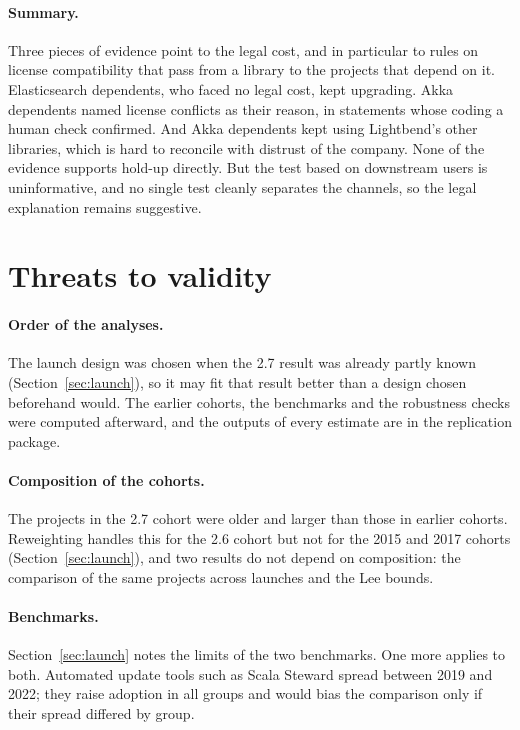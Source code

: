 \documentclass[11pt]{article}
\begin{document}
\paragraph{Summary.} Three pieces of evidence point to the legal cost, and in particular to rules on license compatibility that pass from a library to the projects that depend on it. Elasticsearch dependents, who faced no legal cost, kept upgrading. Akka dependents named license conflicts as their reason, in statements whose coding a human check confirmed. And Akka dependents kept using Lightbend's other libraries, which is hard to reconcile with distrust of the company. None of the evidence supports hold-up directly. But the test based on downstream users is uninformative, and no single test cleanly separates the channels, so the legal explanation remains suggestive.

\section{Threats to validity}\label{sec:threats}

\paragraph{Order of the analyses.} The launch design was chosen when the 2.7 result was already partly known (Section~\ref{sec:launch}), so it may fit that result better than a design chosen beforehand would. The earlier cohorts, the benchmarks and the robustness checks were computed afterward, and the outputs of every estimate are in the replication package.

\paragraph{Composition of the cohorts.} The projects in the 2.7 cohort were older and larger than those in earlier cohorts. Reweighting handles this for the 2.6 cohort but not for the 2015 and 2017 cohorts (Section~\ref{sec:launch}), and two results do not depend on composition: the comparison of the same projects across launches and the Lee bounds.

\paragraph{Benchmarks.} Section~\ref{sec:launch} notes the limits of the two benchmarks. One more applies to both. Automated update tools such as Scala Steward spread between 2019 and 2022; they raise adoption in all groups and would bias the comparison only if their spread differed by group.
\end{document}
